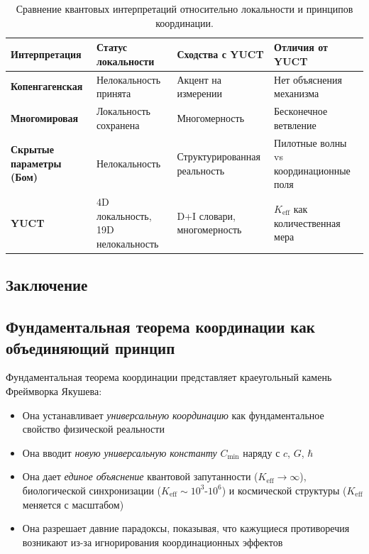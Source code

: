 \documentclass[11pt,a4paper]{article}
\begin{document}
	\begin{table}[htbp]
		\centering
		\begin{tabular}{p{}p{}p{}p{}}
			\toprule
			\textbf{Интерпретация} & \textbf{Статус локальности} & \textbf{Сходства с YUCT} & \textbf{Отличия от YUCT} \\
			\midrule
			\textbf{Копенгагенская} & Нелокальность принята & Акцент на измерении & Нет объяснения механизма \\
			\textbf{Многомировая} & Локальность сохранена & Многомерность & Бесконечное ветвление \\
			\textbf{Скрытые параметры (Бом)} & Нелокальность & Структурированная реальность & Пилотные волны vs координационные поля \\
			\textbf{YUCT} & 4D локальность, 19D нелокальность & D+I словари, многомерность & $K_{\mathrm{eff}}$ как количественная мера \\
			\bottomrule
		\end{tabular}
		\caption{Сравнение квантовых интерпретаций относительно локальности и принципов координации.}
		\label{tab:interpretations}
	\end{table}
	
	\subsection{Заключение}
	\label{subsec:epr-conclusion}
	\subsection{Фундаментальная теорема координации как объединяющий принцип}
	
	Фундаментальная теорема координации представляет краеугольный камень Фреймворка Якушева:
	\begin{itemize}
		\item Она устанавливает \emph{универсальную координацию} как фундаментальное свойство физической реальности
		\item Она вводит \emph{новую универсальную константу} $C_{\min}$ наряду с $c$, $G$, $\hbar$
		\item Она дает \emph{единое объяснение} квантовой запутанности ($K_{\mathrm{eff}} \to \infty$), биологической синхронизации ($K_{\mathrm{eff}} \sim 10^3$-$10^6$) и космической структуры ($K_{\mathrm{eff}}$ меняется с масштабом)
		\item Она разрешает давние парадоксы, показывая, что кажущиеся противоречия возникают из-за игнорирования координационных эффектов
	\end{itemize}
	
\end{document}

